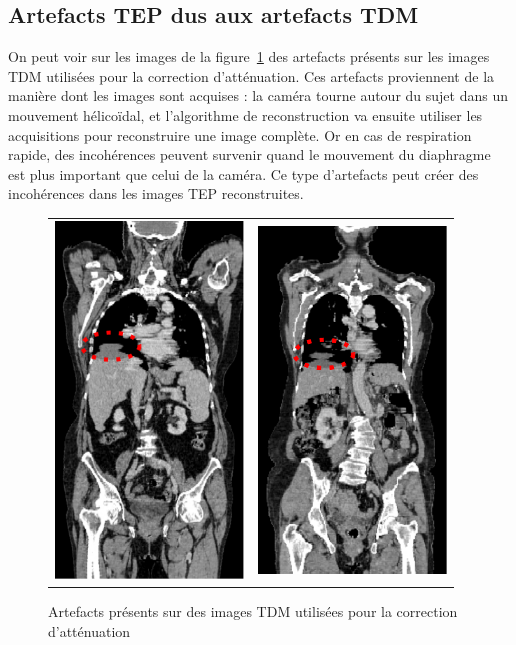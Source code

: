 \subsection{Artefacts TEP dus aux artefacts TDM}

On peut voir sur les images de la figure~\ref{fig:artefactsCT} des artefacts présents sur les images TDM utilisées pour la correction d'atténuation. Ces artefacts proviennent de la manière dont les images sont acquises : la caméra tourne autour du sujet dans un mouvement hélicoïdal, et l'algorithme de reconstruction va ensuite utiliser les acquisitions pour reconstruire une image complète. Or en cas de respiration rapide, des incohérences peuvent survenir quand le mouvement du diaphragme est plus important que celui de la caméra. Ce type d'artefacts peut créer des incohérences dans les images TEP reconstruites.

\begin{figure}[h!]
	\begin{center}
		\begin{tabular}{c c}
			\includegraphics[width=5cm]{images/artefactCT1} & \includegraphics[width=5cm]{images/artefactCT2}
		\end{tabular}
	\end{center}
	\caption{Artefacts présents sur des images TDM utilisées pour la correction d'atténuation} 
	\label{fig:artefactsCT}
\end{figure}


